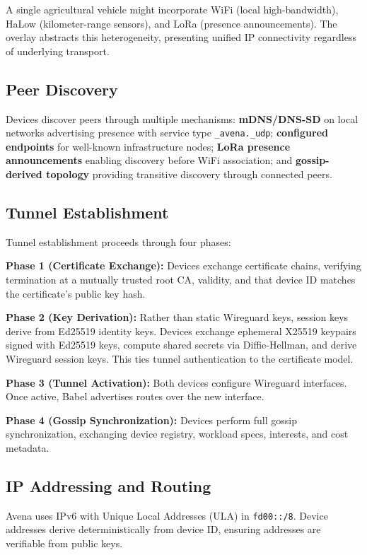 \documentclass[journal]{IEEEtran}
\begin{document}
A single agricultural vehicle might incorporate WiFi (local high-bandwidth), HaLow (kilometer-range sensors), and LoRa (presence announcements). The overlay abstracts this heterogeneity, presenting unified IP connectivity regardless of underlying transport.

\subsection{Peer Discovery}

Devices discover peers through multiple mechanisms: \textbf{mDNS/DNS-SD} on local networks advertising presence with service type \texttt{\_avena.\_udp}; \textbf{configured endpoints} for well-known infrastructure nodes; \textbf{LoRa presence announcements} enabling discovery before WiFi association; and \textbf{gossip-derived topology} providing transitive discovery through connected peers.

\subsection{Tunnel Establishment}

Tunnel establishment proceeds through four phases:

\textbf{Phase 1 (Certificate Exchange):} Devices exchange certificate chains, verifying termination at a mutually trusted root CA, validity, and that device ID matches the certificate's public key hash.

\textbf{Phase 2 (Key Derivation):} Rather than static Wireguard keys, session keys derive from Ed25519 identity keys. Devices exchange ephemeral X25519 keypairs signed with Ed25519 keys, compute shared secrets via Diffie-Hellman, and derive Wireguard session keys. This ties tunnel authentication to the certificate model.

\textbf{Phase 3 (Tunnel Activation):} Both devices configure Wireguard interfaces. Once active, Babel advertises routes over the new interface.

\textbf{Phase 4 (Gossip Synchronization):} Devices perform full gossip synchronization, exchanging device registry, workload specs, interests, and cost metadata.

\subsection{IP Addressing and Routing}

Avena uses IPv6 with Unique Local Addresses (ULA) in \texttt{fd00::/8}. Device addresses derive deterministically from device ID, ensuring addresses are verifiable from public keys.
\end{document}
